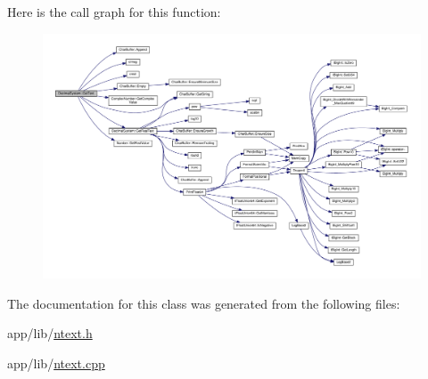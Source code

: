 Here is the call graph for this function\+:
\nopagebreak
\begin{figure}[H]
\begin{center}
\leavevmode
\includegraphics[width=350pt]{df/d40/classDecimalSystem_ab43f764ed35fe831a16a356bbdc72441_cgraph}
\end{center}
\end{figure}




The documentation for this class was generated from the following files\+:\begin{DoxyCompactItemize}
\item 
app/lib/\hyperlink{ntext_8h}{ntext.\+h}\item 
app/lib/\hyperlink{ntext_8cpp}{ntext.\+cpp}\end{DoxyCompactItemize}
